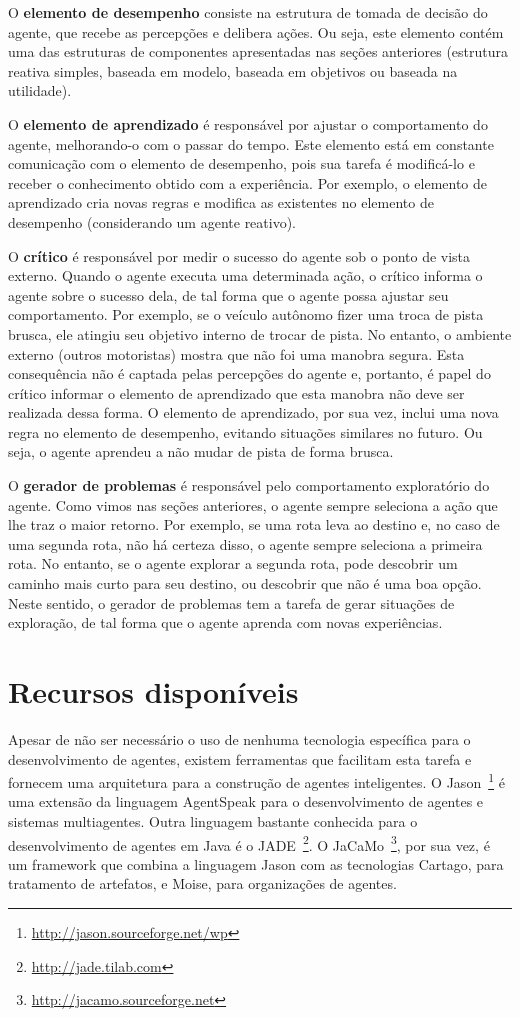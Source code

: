 O \textbf{elemento de desempenho} consiste na estrutura de tomada de decisão do agente, que recebe as percepções e delibera ações. Ou seja, este elemento contém uma das estruturas de componentes apresentadas nas seções anteriores (estrutura reativa simples, baseada em modelo, baseada em objetivos ou baseada na utilidade).

O \textbf{elemento de aprendizado} é responsável por ajustar o comportamento do agente, melhorando-o com o passar do tempo. Este elemento está em constante comunicação com o elemento de desempenho, pois sua tarefa é modificá-lo e receber o conhecimento obtido com a experiência. Por exemplo, o elemento de aprendizado cria novas regras e modifica as existentes no elemento de desempenho (considerando um agente reativo).

O \textbf{crítico} é responsável por medir o sucesso do agente sob o ponto de vista externo. Quando o agente executa uma determinada ação, o crítico informa o agente sobre o sucesso dela, de tal forma que o agente possa ajustar seu comportamento. Por exemplo, se o veículo autônomo fizer uma troca de pista brusca, ele atingiu seu objetivo interno de trocar de pista. No entanto, o ambiente externo (outros motoristas) mostra que não foi uma manobra segura. Esta consequência não é captada pelas percepções do agente e, portanto, é papel do crítico informar o elemento de aprendizado que esta manobra não deve ser realizada dessa forma. O elemento de aprendizado, por sua vez, inclui uma nova regra no elemento de desempenho, evitando situações similares no futuro. Ou seja, o agente aprendeu a não mudar de pista de forma brusca.

O \textbf{gerador de problemas} é responsável pelo comportamento exploratório do agente. Como vimos nas seções anteriores, o agente sempre seleciona a ação que lhe traz o maior retorno. Por exemplo, se uma rota leva ao destino e, no caso de uma segunda rota, não há certeza disso, o agente sempre seleciona a primeira rota. No entanto, se o agente explorar a segunda rota, pode descobrir um caminho mais curto para seu destino, ou descobrir que não é uma boa opção. Neste sentido, o gerador de problemas tem a tarefa de gerar situações de exploração, de tal forma que o agente aprenda com novas experiências.

\section{Recursos disponíveis}

Apesar de não ser necessário o uso de nenhuma tecnologia específica para o desenvolvimento de agentes, existem ferramentas que facilitam esta tarefa e fornecem uma arquitetura para a construção de agentes inteligentes. O Jason~\footnote{\url{http://jason.sourceforge.net/wp}} é uma extensão da linguagem AgentSpeak para o desenvolvimento de agentes e sistemas multiagentes. Outra linguagem bastante conhecida para o desenvolvimento de agentes em Java é o JADE~\footnote{\url{http://jade.tilab.com}}. O JaCaMo~\footnote{\url{http://jacamo.sourceforge.net}}, por sua vez, é um framework que combina a linguagem Jason com as tecnologias Cartago, para tratamento de artefatos, e Moise, para organizações de agentes.

